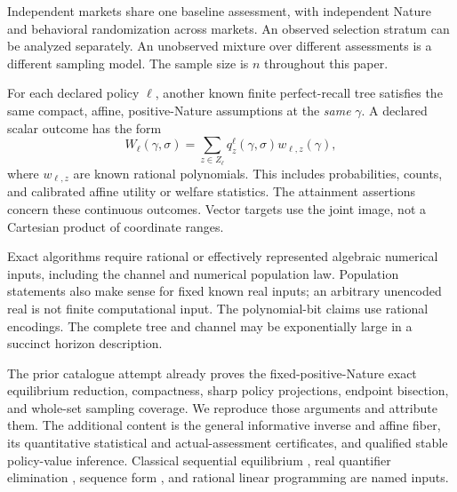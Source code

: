 \documentclass[11pt,a4paper]{article}
\numberwithin{equation}{section}
\theoremstyle{definition}
\begin{document}
Independent markets share one baseline assessment, with independent
Nature and behavioral randomization across markets. An observed
selection stratum can be analyzed separately. An unobserved mixture
over different assessments is a different sampling model.
The sample size is \(n\) throughout this paper.

For each declared policy \(\ell\), another known finite perfect-recall
tree satisfies the same compact, affine, positive-Nature assumptions
at the \emph{same} \(\gamma\). A declared scalar outcome has the form
\begin{equation}\label{eq:policyoutcome}
 W_\ell(\gamma,\sigma)
   =\sum_{z\in Z_\ell}q^\ell_z(\gamma,\sigma)w_{\ell,z}(\gamma),
\end{equation}
where \(w_{\ell,z}\) are known rational polynomials. This includes
probabilities, counts, and calibrated affine utility or welfare
statistics. The attainment assertions concern these continuous
outcomes. Vector targets use the joint image, not a Cartesian product
of coordinate ranges.

Exact algorithms require rational or effectively represented algebraic
numerical inputs, including the channel and numerical population law.
Population statements also make sense for fixed known real inputs;
an arbitrary unencoded real is not finite computational input.
The polynomial-bit claims use rational encodings. The complete tree
and channel may be exponentially large in a succinct horizon description.

The prior catalogue attempt \cite{Prior} already proves the
fixed-positive-Nature exact equilibrium reduction, compactness, sharp
policy projections, endpoint bisection, and whole-set sampling coverage.
We reproduce those arguments and attribute them. The additional content
is the general informative inverse and affine fiber, its quantitative
statistical and actual-assessment certificates, and qualified stable
policy-value inference. Classical sequential equilibrium
\cite{KW}, real quantifier elimination \cite{Basu}, sequence form
\cite{KMS}, and rational linear programming are named inputs.
\end{document}
